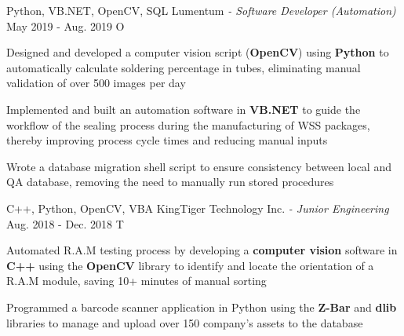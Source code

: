 \begin{siderules}
\begin{cventries}
{\begin{cvitems}
      \end{cvitems}
    }
    \cventry
      {Python, VB.NET, OpenCV, SQL}
      {Lumentum\hspace{0.15em} \bodyfontlight\itshape{- Software Developer (Automation)}}
      {May 2019 - Aug. 2019}
      {O}
      {
        \begin{cvitems}
          \item {Designed and developed a computer vision script (\textbf{OpenCV}) using \textbf{Python} to automatically calculate soldering percentage in tubes, eliminating manual validation of over 500 images per day}
          \item {Implemented and built an automation software in \textbf{VB.NET} to guide the workflow of the sealing process during the manufacturing of WSS packages, thereby improving process cycle times and reducing manual inputs}
          \item {Wrote a database migration shell script to ensure consistency between local and QA database, removing the need to manually run stored procedures}
        \end{cvitems}
      }
    \cventry
      {C++, Python, OpenCV, VBA}
      {KingTiger Technology Inc.\hspace{0.15em} \bodyfontlight\itshape{- Junior Engineering}}
      {Aug. 2018 - Dec. 2018}
      {T}
      {
        \begin{cvitems}
          \item {Automated R.A.M testing process by developing a \textbf{computer vision} software in \textbf{C++} using the \textbf{OpenCV} library to identify and locate the orientation of a R.A.M module, saving 10+ minutes of manual sorting}
          \item {Programmed a barcode scanner application in Python using the \textbf{Z-Bar} and \textbf{dlib} libraries to manage and upload over 150 company’s assets to the database}
        \end{cvitems}
      }
  \end{cventries}
\end{siderules}